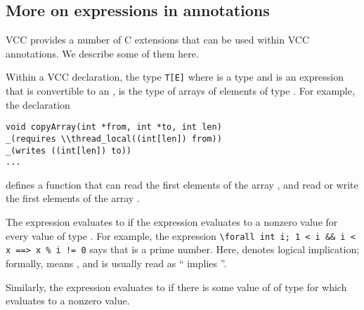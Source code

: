 




\subsection*{More on expressions in annotations}
VCC provides a number of C extensions that can be used within VCC
annotations. We describe some of them here.

Within a VCC declaration, the type \lstinline|T[E]| where  is
a type and  is an expression that is convertible to an
, is the type of arrays of  elements of type
. For example, the declaration
\begin{lstlisting}
void copyArray(int *from, int *to, int len)
_(requires \\thread_local((int[len]) from))
_(writes ((int[len]) to))
...
\end{lstlisting}
defines a function that can read the first  elements of the
array , and read or write the first  elements of
the array .

The expression  evaluates to  if the
expression  evaluates to a nonzero value for every value 
 of type . For example, the expression 
\lstinline|\forall int i; 1 < i && i < x ==> x % i != 0|
says that  is a prime number.
Here, \vcc{==>} denotes logical implication; formally,
 means , and is usually 
read as `` implies ''.

Similarly, the expression  evaluates to  if there
is some value of  of type  for which  evaluates
to a nonzero value.

